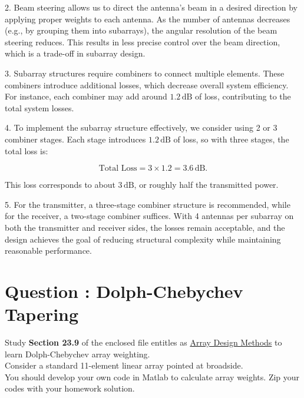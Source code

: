 \documentclass[12pt,onecolumn,a4paper]{article}
\newcommand\question[1][\space]{
	\section[Question \numberstringnum{\thesection}]
	{Question \numberstringnum{\thesection}: #1}
}
\begin{document}
2. Beam steering allows us to direct the antenna's beam in a desired direction by applying proper weights to each antenna. As the number of antennas decreases (e.g., by grouping them into subarrays), the angular resolution of the beam steering reduces. This results in less precise control over the beam direction, which is a trade-off in subarray design.

3. Subarray structures require combiners to connect multiple elements. These combiners introduce additional losses, which decrease overall system efficiency. For instance, each combiner may add around \(1.2 \, \text{dB}\) of loss, contributing to the total system losses.

4. To implement the subarray structure effectively, we consider using 2 or 3 combiner stages. Each stage introduces \(1.2 \, \text{dB}\) of loss, so with three stages, the total loss is:

\[
\text{Total Loss} = 3 \times 1.2 = 3.6 \, \text{dB}.
\]

This loss corresponds to about \(3 \, \text{dB}\), or roughly half the transmitted power.

5. For the transmitter, a three-stage combiner structure is recommended, while for the receiver, a two-stage combiner suffices. With 4 antennas per subarray on both the transmitter and receiver sides, the losses remain acceptable, and the design achieves the goal of reducing structural complexity while maintaining reasonable performance.






\FloatBarrier\question[Dolph-Chebychev Tapering]

{\color{questioncolor}
Study \textbf{Section 23.9} of the enclosed file entitles as \href{https://github.com/MohammadRaziei/phased-array-course/raw/HW02/HW/Array%20Design%20Methods.pdf}{Array Design Methods} to learn Dolph-Chebychev array weighting.\\

Consider a standard 11-element linear array pointed at broadside.\\

You should develop your own code in Matlab to calculate array weights. Zip your codes with your homework solution.
}
\end{document}
